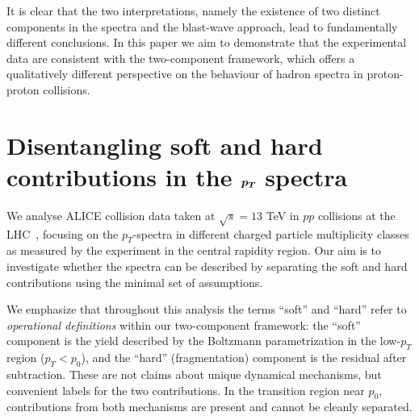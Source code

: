 \documentclass[pdflatex,sn-mathphys-num]{sn-jnl}%
\begin{document}
It is clear that the two interpretations, namely the existence of two distinct components in the spectra and the blast-wave approach, lead to fundamentally different conclusions. In this paper we aim to demonstrate that the experimental data are consistent with the two-component framework, which offers a qualitatively different perspective on the behaviour of hadron spectra in proton-proton collisions.

\section{Disentangling soft and hard contributions in the $\textrm{\boldmath{$p_T$}}$ spectra}

We analyse ALICE collision data taken at $\sqrt{s} = 13$ TeV in $pp$ collisions at the LHC~\cite{ALICE:2020nkc}, focusing on the $p_T$-spectra in different charged particle multiplicity classes as measured by the experiment in the central rapidity region. Our aim is to investigate whether the spectra can be described by separating the soft and hard contributions using the minimal set of assumptions.

We emphasize that throughout this analysis the terms ``soft'' and ``hard'' refer to \emph{operational definitions} within our two-component framework: the ``soft'' component is the yield described by the Boltzmann parametrization in the low-$p_T$ region ($p_T < p_0$), and the ``hard'' (fragmentation) component is the residual after subtraction. These are not claims about unique dynamical mechanisms, but convenient labels for the two contributions. In the transition region near $p_0$, contributions from both mechanisms are present and cannot be cleanly separated.
\end{document}
